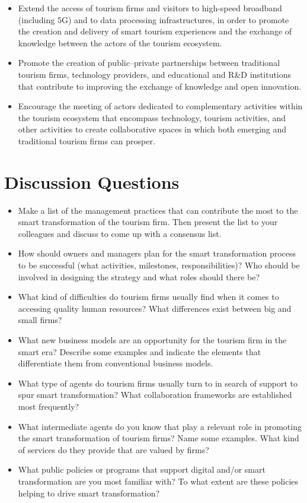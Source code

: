 \documentclass[
  letterpaper,
  DIV=11,
  numbers=noendperiod]{scrreprt}
\begin{document}
\begin{itemize}
  \begin{itemize}
  \item
    Extend the access of tourism firms and visitors to high-speed
    broadband (including 5G) and to data processing infrastructures, in
    order to promote the creation and delivery of smart tourism
    experiences and the exchange of knowledge between the actors of the
    tourism ecosystem.
  \item
    Promote the creation of public--private partnerships between
    traditional tourism firms, technology providers, and educational and
    R\&D institutions that contribute to improving the exchange of
    knowledge and open innovation.
  \item
    Encourage the meeting of actors dedicated to complementary
    activities within the tourism ecosystem that encompass technology,
    tourism activities, and other activities to create collaborative
    spaces in which both emerging and traditional tourism firms can
    prosper.
  \end{itemize}
\end{itemize}

\hypertarget{discussion-questions-12}{%
\section{Discussion Questions}\label{discussion-questions-12}}

\begin{itemize}
\item
  Make a list of the management practices that can contribute the most
  to the smart transformation of the tourism firm. Then present the list
  to your colleagues and discuss to come up with a consensus list.
\item
  How should owners and managers plan for the smart transformation
  process to be successful (what activities, milestones,
  responsibilities)? Who should be involved in designing the strategy
  and what roles should there be?
\item
  What kind of difficulties do tourism firms usually find when it comes
  to accessing quality human resources? What differences exist between
  big and small firms?
\item
  What new business models are an opportunity for the tourism firm in
  the smart era? Describe some examples and indicate the elements that
  differentiate them from conventional business models.
\item
  What type of agents do tourism firms usually turn to in search of
  support to spur smart transformation? What collaboration frameworks
  are established most frequently?
\item
  What intermediate agents do you know that play a relevant role in
  promoting the smart transformation of tourism firms? Name some
  examples. What kind of services do they provide that are valued by
  firms?
\item
  What public policies or programs that support digital and/or smart
  transformation are you most familiar with? To what extent are these
  policies helping to drive smart transformation?
\end{itemize}
\end{document}
